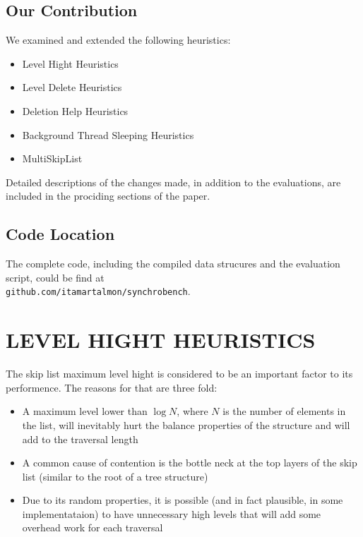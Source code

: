 \documentclass{article}
\begin{document}
\subsection{Our Contribution}
\label{ssec:oc}

We examined and extended the following heuristics:

\begin{itemize}
	\item Level Hight Heuristics
	\item Level Delete Heuristics 
	\item Deletion Help Heuristics
	\item Background Thread Sleeping Heuristics
	\item MultiSkipList
\end{itemize}

\hfill \break
Detailed descriptions of the changes made, in addition to the evaluations, are included in the prociding sections of the paper.

\subsection{Code Location}
\label{ssec:cl}
The complete code, including the compiled data strucures and the evaluation script, could be find at \\\texttt{github.com/itamartalmon/synchrobench}.

\section{LEVEL HIGHT HEURISTICS}
\label{sec:lhh}

The skip list maximum level hight is considered to be an important factor to its performence. The reasons for that are three fold:

\begin{itemize}
	\item  A maximum level lower than $\log{N}$, where $N$ is the number of elements in the list, will inevitably hurt the balance properties of the structure and will add to the traversal length
	\item A common cause of contention is the bottle neck at the top layers of the skip list (similar to the root of a tree structure)
	\item Due to its random properties, it is possible (and in fact plausible, in some implementataion) to have unnecessary high levels that will add some overhead work for each traversal
\end{itemize}
\end{document}
